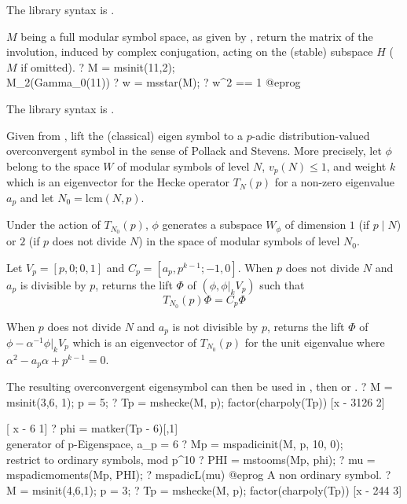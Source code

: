 The library syntax is .

\label{se:msstar}
$M$ being a full modular symbol space, as given by ,
return the matrix of the \kbd{*} involution, induced by complex conjugation,
acting on the (stable) subspace $H$ ($M$ if omitted).
\bprog
? M = msinit(11,2); \\ M_2(Gamma_0(11))
? w = msstar(M);
? w^2 == 1
@eprog

The library syntax is .

\label{se:mstooms}
Given  from , lift the (classical) eigen symbol
 to a $p$-adic distribution-valued overconvergent symbol in the
sense of Pollack and Stevens. More precisely, let $\phi$ belong to the space
$W$ of modular symbols of level $N$, $v_p(N) \leq 1$, and weight $k$ which is
an eigenvector for the Hecke operator $T_N(p)$ for a non-zero eigenvalue
$a_p$ and let $N_0 = \text{lcm}(N,p)$.

Under the action of $T_{N_0}(p)$, $\phi$ generates a subspace $W_\phi$ of
dimension $1$ (if $p\mid N$) or $2$ (if $p$ does not divide $N$) in the
space of modular symbols of level $N_0$.

Let $V_p=[p,0;0,1]$ and $C_p=[a_p,p^{k-1};-1,0]$.
When $p$ does not divide $N$ and $a_p$ is divisible by $p$, 
returns the lift $\Phi$ of $(\phi,\phi|_k V_p)$ such that
 $$T_{N_0}(p) \Phi = C_p \Phi$$

When $p$ does not divide $N$ and $a_p$ is not divisible by $p$, 
returns the lift $\Phi$ of $\phi - \alpha^{-1} \phi|_k V_p$
which is an eigenvector of $T_{N_0}(p)$ for the unit eigenvalue
where $\alpha^2 - a_p \alpha + p^{k-1}=0$.

The resulting overconvergent eigensymbol can then be used in
, then  or .
\bprog
? M = msinit(3,6, 1); p = 5;
? Tp = mshecke(M, p); factor(charpoly(Tp))
[x - 3126 2]

[   x - 6 1]
? phi = matker(Tp - 6)[,1] \\ generator of p-Eigenspace, a_p = 6
? Mp = mspadicinit(M, p, 10, 0); \\ restrict to ordinary symbols, mod p^10
? PHI = mstooms(Mp, phi);
? mu = mspadicmoments(Mp, PHI);
? mspadicL(mu)
@eprog
A non ordinary symbol.
\bprog
? M = msinit(4,6,1); p = 3;
? Tp = mshecke(M, p); factor(charpoly(Tp))
[x - 244 3]

